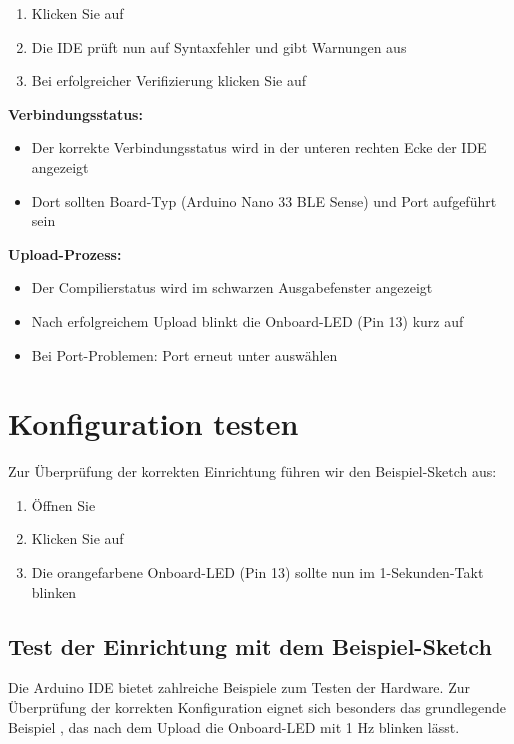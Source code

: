 \begin{enumerate}
	\item Klicken Sie auf 
	\item Die IDE prüft nun auf Syntaxfehler und gibt Warnungen aus
	\item Bei erfolgreicher Verifizierung klicken Sie auf  
\end{enumerate}

\noindent\textbf{Verbindungsstatus:}
\begin{itemize}
	\item Der korrekte Verbindungsstatus wird in der unteren rechten Ecke der IDE angezeigt
	\item Dort sollten Board-Typ (Arduino Nano 33 BLE Sense) und Port aufgeführt sein
\end{itemize}

\noindent\textbf{Upload-Prozess:}
\begin{itemize}
	\item Der Compilierstatus wird im schwarzen Ausgabefenster angezeigt
	\item Nach erfolgreichem Upload blinkt die Onboard-LED (Pin 13) kurz auf
	\item Bei Port-Problemen: Port erneut unter  auswählen
\end{itemize}

\section{Konfiguration testen}

Zur Überprüfung der korrekten Einrichtung führen wir den Beispiel-Sketch  aus:

\begin{enumerate}
	\item Öffnen Sie 
	\item Klicken Sie auf 
	\item Die orangefarbene Onboard-LED (Pin 13) sollte nun im 1-Sekunden-Takt blinken
\end{enumerate}


\subsection{Test der Einrichtung mit dem Beispiel-Sketch }

Die Arduino IDE bietet zahlreiche Beispiele zum Testen der Hardware. Zur Überprüfung der korrekten Konfiguration eignet sich besonders das grundlegende Beispiel , das nach dem Upload die Onboard-LED mit 1 Hz blinken lässt.


